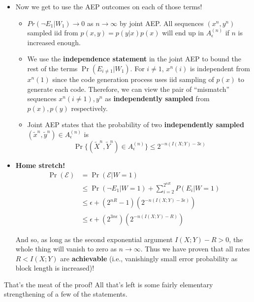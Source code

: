 \documentclass[a4paper,12pt]{report}
\begin{document}
\begin{itemize}
\item Now we get to use the AEP outcomes on each of those terms!
	\begin{itemize}
	\item $Pr(\neg E_1 | W_1) \to 0$ as $n\to \infty$ by joint AEP. All sequences
	$(x^n, y^n)$ sampled iid from $p(x, y) = p(y | x) p(x)$ will end up in
	$A_\epsilon^{(n)}$ if $n$ is increased enough.
	\item We use the \textbf{independence statement} in the joint AEP to bound
	the rest of the terms $\Pr(E_{i\neq 1} | W_1)$. For $i \neq 1$, $x^n(i)$ is
	independent from $x^n(1)$ since the code generation process uses iid
	sampling of $p(x)$ to generate each code. Therefore, we can view the pair of
	``mismatch'' sequences $x^n(i\neq 1), y^n$ as \textbf{independently sampled}
	from $p(x), p(y)$ respectively.
	\item Joint AEP states that the probability of two \textbf{independently
	sampled} $(\tilde x^n, \tilde y^n) \in A_\epsilon^{(n)}$ is 
		\begin{equation}
			\Pr\{(\tilde X^n, \tilde Y^n) \in A_\epsilon^{(n)}\} 
			\leq 
			2^{-n(I(X; Y) - 3\epsilon)}
		\end{equation}
	\end{itemize}

\item \textbf{Home stretch!} 
	\begin{align}
		\Pr(\mathcal E) &= \Pr(\mathcal E | W=1) \\ 
		& \leq \Pr(\neg E_1 | W = 1) + \sum_{i=2}^{2^{nR}} P(E_i | W = 1) \\
		& \leq \epsilon + (2^{nR} - 1) (2^{-n(I(X; Y) - 3\epsilon)}) \\
		& \leq \epsilon + (2^{3n\epsilon}) (2^{-n(I(X; Y) - R)}) 
	\end{align}

	And so, as long as the second exponential argument $I(X; Y) - R > 0$, the
	whole thing will vanish to zero as $n\to \infty$. Thus we have proven that
	all rates $R < I(X; Y)$ are \textbf{achievable} (i.e., vanishingly small
	error probability as block length is increased)! \qedsymbol{}
\end{itemize}


That's the meat of the proof! All that's left is some fairly elementary
strengthening of a few of the statements. 
\end{document}
